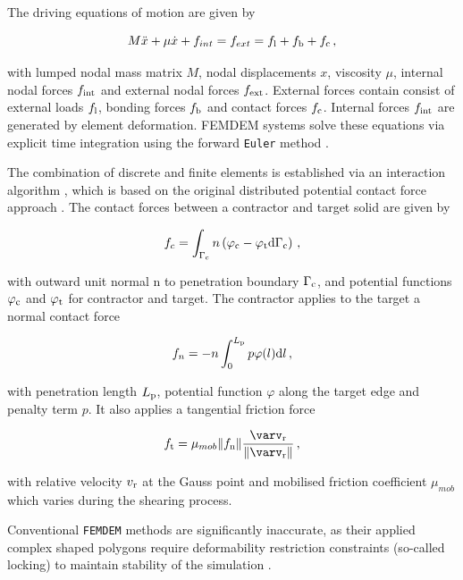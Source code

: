 \documentclass[format=acmtog, 12pt, screen=true, review=false]{acmart}
\begin{document}
\bigbreak
The driving equations of motion are given by

\begin{equation}
    M\ddot{x}+\mu\dot{x}+f_{int}=f_{ext}=f_{\rm{l}}+f_{\rm{b}}+f_{\rm{c}}\,,
\end{equation}

with lumped nodal mass matrix $M$, nodal displacements $x$, viscosity $\mu$, internal nodal forces $f_{\rm{int}}$ and external nodal forces $f_{\rm{ext}}$. External forces contain consist of external loads $f_{\rm{l}}$, bonding forces $f_{\rm{b}}$ and contact forces $f_{\rm{c}}$. Internal forces $f_{\rm{int}}$ are generated by element deformation. FEMDEM systems solve these equations via explicit time integration using the forward \texttt{Euler} method \cite{Lei16}.

\bigbreak
The combination of discrete and finite elements is established via an interaction algorithm \cite{Lei16}, which is based on the original distributed potential contact force approach \cite{Mun13}. The contact forces between a contractor and target solid are given by

\begin{equation}
    f_c=\int_{\Gamma_{\rm{c}}}n\left(\varphi_{\rm{c}}-\varphi_{\rm{t}}\rm{d}\Gamma_{\rm{c}}\right)\,,
\end{equation}

with outward unit normal n to penetration boundary $\Gamma_{\rm{c}}$, and potential functions $\varphi_{\rm{c}}$ and $\varphi_{\rm{t}}$ for contractor and target. The contractor applies to the target a normal contact force

\begin{equation}
    f_n=-n\int_0^{L_{\rm{p}}} p\varphi(l){\rm{d}}l\,,
\end{equation}

with penetration length $L_{\rm{p}}$, potential function $\varphi$ along the target edge and penalty term $p$. It also applies a tangential friction force 

\begin{equation}
    f_{\rm{t}}=\mu_{mob}\lVert f_{\rm{n}} \rVert\frac{\varv_{\rm{r}}}{\lVert \varv_{\rm{r}}\rVert}\,,
\end{equation}

with relative velocity $v_{\rm{r}}$ at the Gauss point and mobilised friction coefficient $\mu_{mob}$ which varies during the shearing process.

\bigbreak
Conventional \texttt{FEMDEM} methods are significantly inaccurate, as their applied complex shaped polygons require deformability restriction constraints (so-called locking) to maintain stability of the simulation \cite{Lat15}. 
\end{document}
